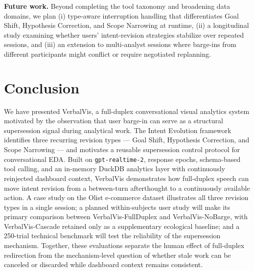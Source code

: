 \documentclass[journal]{IEEEtran}
\begin{document}
\textbf{Future work.} Beyond completing the tool taxonomy and broadening data domains, we plan (i) type-aware interruption handling that differentiates Goal Shift, Hypothesis Correction, and Scope Narrowing at runtime, (ii) a longitudinal study examining whether users' intent-revision strategies stabilize over repeated sessions, and (iii) an extension to multi-analyst sessions where barge-ins from different participants might conflict or require negotiated replanning.

\section{Conclusion}
\label{sec:conclusion}
We have presented VerbalVis, a full-duplex conversational visual analytics system motivated by the observation that user barge-in can serve as a structural supersession signal during analytical work. The Intent Evolution framework identifies three recurring revision types --- Goal Shift, Hypothesis Correction, and Scope Narrowing --- and motivates a reusable supersession control protocol for conversational EDA. Built on \texttt{gpt-realtime-2}, response epochs, schema-based tool calling, and an in-memory DuckDB analytics layer with continuously reinjected dashboard context, VerbalVis demonstrates how full-duplex speech can move intent revision from a between-turn afterthought to a continuously available action. A case study on the Olist e-commerce dataset illustrates all three revision types in a single session; a planned within-subjects user study will make its primary comparison between VerbalVis-FullDuplex and VerbalVis-NoBarge, with VerbalVis-Cascade retained only as a supplementary ecological baseline; and a 250-trial technical benchmark will test the reliability of the supersession mechanism. Together, these evaluations separate the human effect of full-duplex redirection from the mechanism-level question of whether stale work can be canceled or discarded while dashboard context remains consistent.



\end{document}

